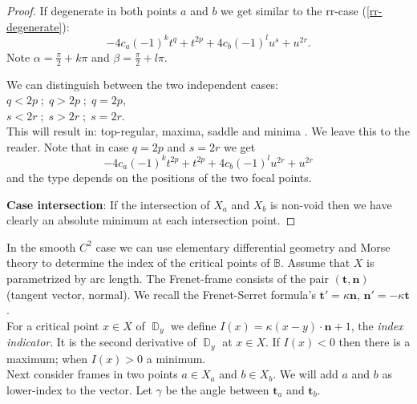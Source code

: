 \documentclass[12pt,a4,twoside]{amsart}
\DeclareMathOperator{\sq}{\mathbb{D}}
\newtheorem*{main lemma}{The main lemma}
\begin{document}
\begin{proof}
If degenerate in both points $a$ and $b$ we get similar to the rr-case (\ref{rr-degenerate}):
$$  -4 c_a (-1)^k t^q +t^{2 p} +4 c_b (-1)^l u^s+u^{2 r}.$$
Note $  \alpha = \frac{\pi}{2} + k \pi$ and $\beta = \frac{\pi}{2} + l \pi$. 

We can distinguish between  the two independent cases:\\
$q < 2p \; ; \; q > 2p \; ; \; q = 2p$,\\
$s < 2r \; ; \; s > 2r \; ; \; s = 2r$.\\
This will result in: top-regular, maxima, saddle and minima . We leave this to the reader.
Note that in case $q=2p$ and $s=2r$ we get
\begin{equation}
 -4 c_a (-1)^k t^{2p} +t^{2 p} +4 c_b (-1)^l u^{2r}+u^{2 r}
\end{equation}
and the type depends on the positions of the two focal points.

{\bf Case intersection}: If the intersection of $X_a$ and $X_b$ is non-void then we have clearly an absolute minimum at each intersection point.
\end{proof}



In the smooth $C^2$ case we can use elementary differential geometry and Morse theory to determine the index of the critical points of $\mathbb{B}$.
Assume that $X$ is parametrized by arc length. The Frenet-frame consists of the pair $(\mathbf{t},\mathbf{n})$ (tangent vector, normal). We recall the  Frenet-Serret formula's $\mathbf{t}'= \kappa \mathbf{n}$, $\mathbf{n}'= - \kappa \mathbf{t} $ . \\ 

For a critical point $x \in X$ of  $\sq_y$ we  define $I(x) = \kappa  (x-y)\cdot \mathbf{n} +1$, the \textit{index indicator}. It is the second derivative of  $\sq_y$ at $x \in X$. If $I(x) < 0$ then there is a maximum; when $I(x) > 0$ a minimum.\\

Next consider frames in two points $a \in X_a$ and $b \in X_b$. We will add $a$ and $b$ as lower-index to the vector.
 Let $\gamma$ be the angle between $\mathbf{t}_a$ and $\mathbf{t}_b$.
 
 
\end{document}

